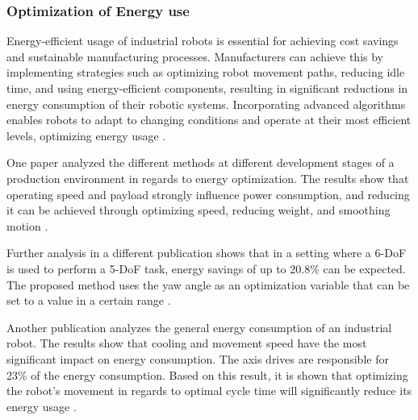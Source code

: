 \subsubsection{Optimization of Energy use}
Energy-efficient usage of industrial robots is essential for achieving cost savings and sustainable manufacturing processes. Manufacturers can achieve this by implementing strategies such as optimizing robot movement paths, reducing idle time, and using energy-efficient components, resulting in significant reductions in energy consumption of their robotic systems. Incorporating advanced algorithms enables robots to adapt to changing conditions and operate at their most efficient levels, optimizing energy usage \cite{Uhlmann.2016}. 

One paper analyzed the different methods at different development stages of a production environment in regards to energy optimization. The results show that operating speed and payload strongly influence power consumption, and reducing it can be achieved through optimizing speed, reducing weight, and smoothing motion \cite{Paryanto.2015}.

Further analysis in a different publication shows that in a setting where a 6-DoF is used to perform a 5-DoF task, energy savings of up to 20.8\% can be expected. The proposed method uses the yaw angle as an optimization variable that can be set to a value in a certain range \cite{Boscariol.2020}. 

Another publication analyzes the general energy consumption of an industrial robot. The results show that cooling and movement speed have the most significant impact on energy consumption. The axis drives are responsible for 23\% of the energy consumption. Based on this result, it is shown that optimizing the robot's movement in regards to optimal cycle time will significantly reduce its energy usage \cite{Uhlmann.2016}. 




